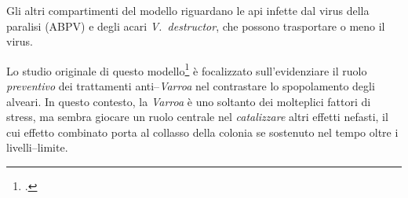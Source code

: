 Gli altri compartimenti del modello riguardano le api infette dal virus della paralisi (ABPV) e degli acari
\emph{V.~destructor}, che possono trasportare o meno il virus.

Lo studio originale di questo modello\footcite{ratti2017} è focalizzato sull'evidenziare il ruolo \emph{preventivo}
dei trattamenti anti--\emph{Varroa} nel contrastare lo spopolamento degli alveari.
In questo contesto, la \emph{Varroa} è uno soltanto dei molteplici fattori di stress, ma sembra giocare
un ruolo centrale nel \emph{catalizzare} altri effetti nefasti, il cui effetto combinato porta al collasso
della colonia se sostenuto nel tempo oltre i livelli--limite.




